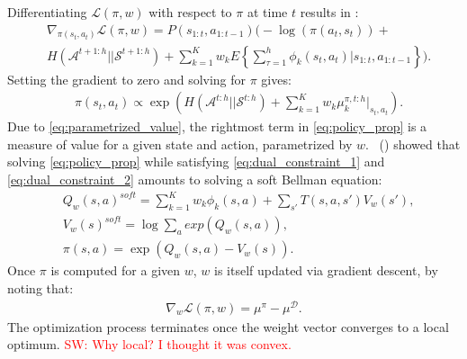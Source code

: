 \documentclass[letterpaper]{article}
\newcommand{\citet}[1]{\citeauthor{#1}~(\citeyear{#1})}
\newcommand{\sw}[1]{\textcolor{red}{SW: #1}}
\newcommand{\sw}[1]{}
\begin{document}
Differentiating $\mathcal{L}(\pi,w)$ with respect to $\pi$ at time $t$ results in \cite[p.\ 186]{ziebart2010modelingthesis}:
\begin{equation}
 \begin{split}
 &\nabla_{\pi(s_t,a_t)}\mathcal{L}(\pi,w) = P(s_{1:t},a_{1:t-1})\Bigg(-\log(\pi(a_t,s_t))+ \\
& H(\mathcal{A}^{t+1:h}||\mathcal{S}^{t+1:h})
 +\sum_{k=1}^K w_kE\left\{\sum_{\tau=1}^h \phi_k(s_t,a_t)|s_{1:t},a_{1:t-1}\right\}\Bigg). \label{eqn:zieb_lagragian_derivative}
 \end{split}
\end{equation}
Setting the gradient to zero and solving for $\pi$ gives:
\begin{equation}
\label{eq:policy_prop}
	\begin{split}
	&\pi(s_t,a_t) \propto \exp\left(H(\mathcal{A}^{t:h}||\mathcal{S}^{t:h})+\sum^K_{k=1} w_k\mu_k^{\pi,t:h}|_{s_t,a_t}\right).
	\end{split}
\end{equation}
Due to \eqref{eq:parametrized_value}, the rightmost term in \eqref{eq:policy_prop} is a measure of value for a given state and action, parametrized by $w$. \citet{ziebart2010modelingthesis} showed that solving \eqref{eq:policy_prop} while satisfying \eqref{eq:dual_constraint_1} and \eqref{eq:dual_constraint_2} amounts to solving a soft Bellman equation:
	\begin{equation}
		\begin{split}
	&Q_w(s,a)^{soft} = \sum_{k=1}^Kw_k\phi_k(s,a) + \sum_{s'}T(s,a,s')V_w(s'),\\	
	&V_w(s)^{soft} = \log\sum_{a}exp(Q_w(s,a)),\\
	&\pi(s,a) = \exp(Q_w(s,a) - V_w(s)).
	\end{split}
	\label{eq:soft_backup}
	\end{equation}
Once $\pi$ is computed for a given $w$, $w$ is itself updated via gradient descent, by noting that:
 \begin{align}
   \label{eq:weight_update}
   \nabla_{w}\mathcal{L}(\pi,w) =\mu^\pi - \mu^{\mathcal{D}}.
 \end{align}
The optimization process terminates once the weight vector converges to a local optimum. \sw{Why local? I thought it was convex.}
\end{document}

